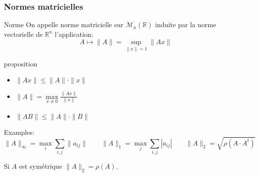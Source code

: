 \documentclass{beamer}
\begin{document}

\begin{frame}
\frametitle{Normes matricielles}
\begin{block}{Norme}
On appelle norme matricielle sur $\mathscr{M}_n \left( \mathbb{R} \right)$ induite par la norme vectorielle de $\mathbb{R}^n$ l'application:
\[
A \longmapsto \| A \| = \sup_{\| x\| =1} \| A x \|
\]
\end{block}

\begin{block}{proposition}
\begin{itemize}
\item $\| A x \| \leqslant \| A \| \cdot \| x \| $
\item  $\| A  \| = \max\limits_{x \neq 0} \frac{\| A x \|}{\| x \|}$
\item $\| A B \| \leqslant \| A \| \cdot \| B \|$
\end{itemize}
\end{block}

Examples:
\[ \| A \| _\infty = \max\limits_i \sum\limits_{i, j} \| a_{ij} \| \qquad  \|A \|_1 = \max\limits_{j} \sum\limits_{i, j} | a_{ij} |\qquad    \|A \|_2= \sqrt{\rho( A \cdot A^t)}\]

Si $A$ est symétrique $\|A \|_2 = \rho(A)$. 


\end{frame}
\end{document}
